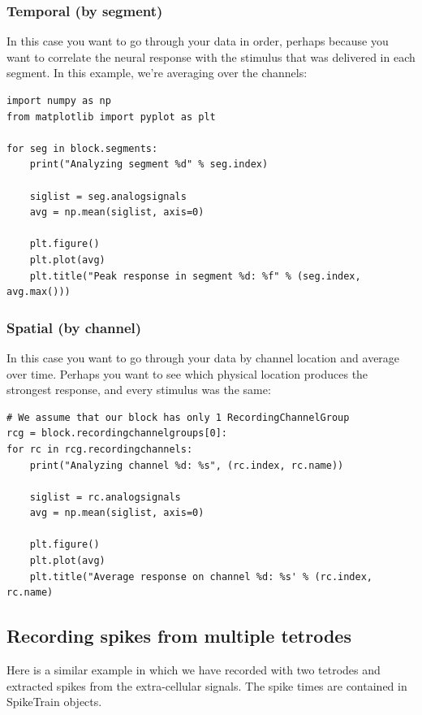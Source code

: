 \documentclass{frontiers}
\begin{document}
\subsubsection{Temporal (by segment)}

In this case you want to go through your data in order, perhaps because you want to correlate the neural response with the stimulus that was delivered in each segment. In this example, we’re averaging over the channels:

\begin{lstlisting}[style=display]
import numpy as np
from matplotlib import pyplot as plt

for seg in block.segments:
    print("Analyzing segment %d" % seg.index)

    siglist = seg.analogsignals
    avg = np.mean(siglist, axis=0)

    plt.figure()
    plt.plot(avg)
    plt.title("Peak response in segment %d: %f" % (seg.index, avg.max()))
\end{lstlisting}

\subsubsection{Spatial (by channel)}

In this case you want to go through your data by channel location and average over time. Perhaps you want to see which physical location produces the strongest response, and every stimulus was the same:

\begin{lstlisting}[style=display]
# We assume that our block has only 1 RecordingChannelGroup
rcg = block.recordingchannelgroups[0]:
for rc in rcg.recordingchannels:
    print("Analyzing channel %d: %s", (rc.index, rc.name))

    siglist = rc.analogsignals
    avg = np.mean(siglist, axis=0)

    plt.figure()
    plt.plot(avg)
    plt.title("Average response on channel %d: %s' % (rc.index, rc.name)
\end{lstlisting}


\subsection{Recording spikes from multiple tetrodes}

Here is a similar example in which we have recorded with two tetrodes and extracted spikes from the extra-cellular signals. The spike times are contained in SpikeTrain objects.
\end{document}
